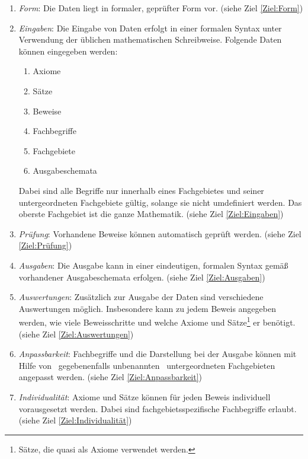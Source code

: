 \documentclass[english,ngerman,parskip=half,headsepline,footsepline]{scrreprt}
\begin{document}
	\begin{enumerate}
			
		\item \label{Anforderung:Form} \emph{Form}: Die Daten liegt in formaler, geprüfter Form vor. (siehe Ziel \vref{Ziel:Form})
		
		\item \label{Anforderung:Eingaben} \emph{Eingaben}: Die Eingabe von Daten erfolgt in einer formalen Syntax unter Verwendung der üblichen mathematischen Schreibweise. Folgende Daten können eingegeben werden:
		\begin{enumerate}
			\item Axiome
			\item Sätze
			\item Beweise
			\item Fachbegriffe
			\item Fachgebiete
			\item Ausgabeschemata
		\end{enumerate}
		Dabei sind alle Begriffe nur innerhalb eines Fachgebietes und seiner untergeordneten Fachgebiete gültig, solange sie nicht umdefiniert werden. Das oberste Fachgebiet ist die ganze Mathematik. (siehe Ziel \vref{Ziel:Eingaben})
		
		\item \label{Anforderung:Prüfung} \emph{Prüfung}: Vorhandene Beweise können automatisch geprüft werden. (siehe Ziel \vref{Ziel:Prüfung})
		
		\item \label{Anforderung:Ausgaben} \emph{Ausgaben}: Die Ausgabe kann in einer eindeutigen, formalen Syntax gemäß vorhandener Ausgabeschemata erfolgen. (siehe Ziel \vref{Ziel:Ausgaben})
		
		\item \label{Anforderung:Auswertungen} \emph{Auswertungen}: Zusätzlich zur Ausgabe der Daten sind verschiedene Auswertungen möglich. Insbesondere kann zu jedem Beweis angegeben werden, wie viele Beweisschritte und welche Axiome und Sätze\footnote{ Sätze, die quasi als Axiome verwendet werden.} er benötigt. (siehe Ziel \vref{Ziel:Auswertungen})
		
		\item \label{Anforderung:Anpassbarkeit} \emph{Anpassbarkeit}: Fachbegriffe und die Darstellung bei der Ausgabe können mit Hilfe von \textendash\ gegebenenfalls unbenannten \textendash\ untergeordneten Fachgebieten angepasst werden. (siehe Ziel \vref{Ziel:Anpassbarkeit})
		
		\item \label{Anforderung:Individualität} \emph{Individualität}: Axiome und Sätze können für jeden Beweis individuell vorausgesetzt werden. Dabei sind fachgebietsspezifische Fachbegriffe erlaubt. (siehe Ziel \vref{Ziel:Individualität})
		

\end{enumerate}
\end{document}
